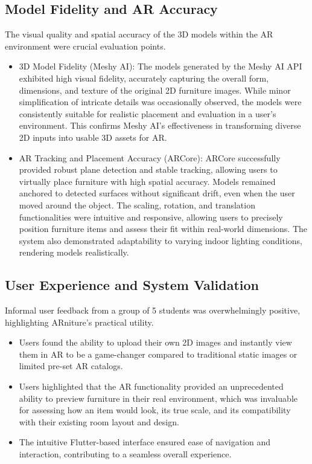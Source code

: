 \documentclass[12pt, a4paper]{article}
\begin{document}
\subsection{Model Fidelity and AR Accuracy}
The visual quality and spatial accuracy of the 3D models within the AR environment were crucial evaluation points.
\begin{itemize}
\item 3D Model Fidelity (Meshy AI): The models generated by the Meshy AI API exhibited high visual fidelity, accurately capturing the overall form, dimensions, and texture of the original 2D furniture images. While minor simplification of intricate details was occasionally observed, the models were consistently suitable for realistic placement and evaluation in a user's environment. This confirms Meshy AI's effectiveness in transforming diverse 2D inputs into usable 3D assets for AR.
\item AR Tracking and Placement Accuracy (ARCore): ARCore successfully provided robust plane detection and stable tracking, allowing users to virtually place furniture with high spatial accuracy. Models remained anchored to detected surfaces without significant drift, even when the user moved around the object. The scaling, rotation, and translation functionalities were intuitive and responsive, allowing users to precisely position furniture items and assess their fit within real-world dimensions. The system also demonstrated adaptability to varying indoor lighting conditions, rendering models realistically.
\end{itemize}

\subsection{User Experience and System Validation}
Informal user feedback from a group of 5 students was overwhelmingly positive, highlighting ARniture's practical utility.
\begin{itemize}
\item Users found the ability to upload their own 2D images and instantly view them in AR to be a game-changer compared to traditional static images or limited pre-set AR catalogs.
\item Users highlighted that the AR functionality provided an unprecedented ability to preview furniture in their real environment, which was invaluable for assessing how an item would look, its true scale, and its compatibility with their existing room layout and design.
\item The intuitive Flutter-based interface ensured ease of navigation and interaction, contributing to a seamless overall experience.
\end{itemize}
\end{document}
